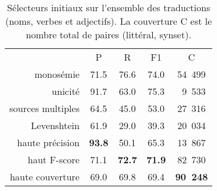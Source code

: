 \let\b\textbf

\begin{table}[ht]
\centering
\begin{tabular}{rcccc}
  \toprule
                    & P & R & F1 & C \\
  monosémie         & 71.5 & 76.6 & 74.0 & 54~499 \\
  unicité           & 91.7 & 63.0 & 75.3 & ~9~533 \\
  sources multiples & 64.5 & 45.0 & 53.0 & 27~316 \\
  Levenshtein       & 61.9 & 29.0 & 39.3 & 20~034 \\
  \midrule
  haute précision   & \b{93.8} & 50.1     & 65.3     & 13~867 \\
  haut F-score      & 71.1     & \b{72.7} & \b{71.9} & 82~730 \\
  haute couverture  & 69.0     & 69.8     & 69.4     & \b{90~248} \\
  \bottomrule
\end{tabular}
\caption{\protect\centering\label{table:heuristics}Sélecteurs initiaux sur l'ensemble des traductions (noms, verbes et adjectifs). La couverture C est le nombre total de paires (littéral, synset).}
\end{table}


